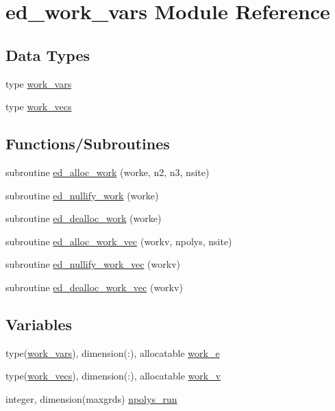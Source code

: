 \hypertarget{namespaceed__work__vars}{}\section{ed\+\_\+work\+\_\+vars Module Reference}
\label{namespaceed__work__vars}
\subsection*{Data Types}
\begin{DoxyCompactItemize}
\item 
type \hyperlink{structed__work__vars_1_1work__vars}{work\+\_\+vars}
\item 
type \hyperlink{structed__work__vars_1_1work__vecs}{work\+\_\+vecs}
\end{DoxyCompactItemize}
\subsection*{Functions/\+Subroutines}
\begin{DoxyCompactItemize}
\item 
subroutine \hyperlink{namespaceed__work__vars_a01ba1ac60fb7fc6120b2caa0044b3c21}{ed\+\_\+alloc\+\_\+work} (worke, n2, n3, nsite)
\item 
subroutine \hyperlink{namespaceed__work__vars_aa1df64125c17b7fc7f50eda82c32e805}{ed\+\_\+nullify\+\_\+work} (worke)
\item 
subroutine \hyperlink{namespaceed__work__vars_afa61eb802d72e14002f44379afceea9d}{ed\+\_\+dealloc\+\_\+work} (worke)
\item 
subroutine \hyperlink{namespaceed__work__vars_a5df6efe6c5b192d365161ad999858f25}{ed\+\_\+alloc\+\_\+work\+\_\+vec} (workv, npolys, nsite)
\item 
subroutine \hyperlink{namespaceed__work__vars_a328d5a0e766e58bd6e2b015fa91ad8db}{ed\+\_\+nullify\+\_\+work\+\_\+vec} (workv)
\item 
subroutine \hyperlink{namespaceed__work__vars_a61bfa6695e1a8ac94e02b917a83aabea}{ed\+\_\+dealloc\+\_\+work\+\_\+vec} (workv)
\end{DoxyCompactItemize}
\subsection*{Variables}
\begin{DoxyCompactItemize}
\item 
type(\hyperlink{structed__work__vars_1_1work__vars}{work\+\_\+vars}), dimension(\+:), allocatable \hyperlink{namespaceed__work__vars_a9587eaf2a297aea9337288fbd4697cde}{work\+\_\+e}
\item 
type(\hyperlink{structed__work__vars_1_1work__vecs}{work\+\_\+vecs}), dimension(\+:), allocatable \hyperlink{namespaceed__work__vars_aad831dc3295b5ee4dbd0b01c0fe47e37}{work\+\_\+v}
\item 
integer, dimension(maxgrds) \hyperlink{namespaceed__work__vars_aeed3989f9c97cab11bdf68227df4b75d}{npolys\+\_\+run}
\end{DoxyCompactItemize}


